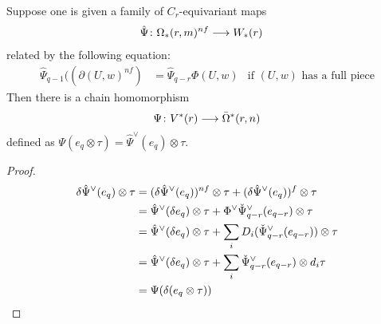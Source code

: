 \begin{lemma}\label{lemma:omegarm} Suppose one is given a family of $C_r$-equivariant maps
	\begin{align*}
		\hat{\Psi}\colon \Omega_*(r,m)^{nf}&\longrightarrow W_*(r)
	\end{align*}
	related by the following equation:
	\begin{align}\label{it:1a}
		\hat{\Psi}_{q-1}((\partial (U,w)^{nf}) &= \hat{\Psi}_{q-r}\Phi(U,w) &\text{if $(U,w)$ has a full piece}
	\end{align}
		Then there is a chain homomorphism
		\[\Psi\colon V^*(r)\longrightarrow \bar{\Omega}^*(r,n)\]
		defined as $\Psi(e_q\otimes \tau) = \hat{\Psi}^\vee(e_q)\otimes \tau$.
	\end{lemma}
	\begin{proof}
		\begin{align*}\delta\hat{\Psi}^{\vee}(e_q)\otimes \tau
			&= (\delta\hat{\Psi}^{\vee}(e_q))^{nf}\otimes\tau + (\delta\hat{\Psi}^{\vee}(e_q))^f\otimes\tau \\
			&= \hat{\Psi}^{\vee}(\delta e_q)\otimes \tau + \Phi^\vee\check{\Psi}^\vee_{q-r}(e_{q-r})\otimes\tau \\
			&= \hat{\Psi}^{\vee}(\delta e_{q})\otimes \tau + \sum_i D_i(\check{\Psi}^\vee_{q-r}(e_{q-r}))\otimes \tau\\
			&= \hat{\Psi}^{\vee}(\delta e_q)\otimes \tau + \sum_i \check{\Psi}^\vee_{q-r}(e_{q-r})\otimes d_i\tau \\
			&= \Psi(\delta(e_q\otimes \tau))\qedhere
		\end{align*}
	\end{proof}

